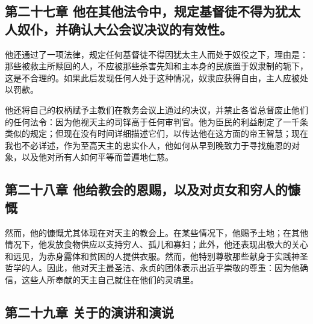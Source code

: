 
\subsection{第二十七章 他在其他法令中，规定基督徒不得为犹太人奴仆，并确认大公会议决议的有效性。}

他还通过了一项法律，规定任何基督徒不得因犹太主人而处于奴役之下，理由是：那些被救主所赎回的人，不应被那些杀害先知和主本身的民族置于奴隶制的轭下，这是不合理的。如果此后发现任何人处于这种情况，奴隶应获得自由，主人应被处以罚款。\par

他还将自己的权柄赋予主教们在教务会议上通过的决议，并禁止各省总督废止他们的任何法令：因为他视天主的司铎高于任何审判官。他为臣民的利益制定了一千条类似的规定；但现在没有时间详细描述它们，以传达他在这方面的帝王智慧；现在我也不必详述，作为至高天主的忠实仆人，他如何从早到晚致力于寻找施恩的对象，以及他对所有人如何平等而普遍地仁慈。\par


\subsection{第二十八章 他给教会的恩赐，以及对贞女和穷人的慷慨}

然而，他的慷慨尤其体现在对天主的教会上。在某些情况下，他赐予土地；在其他情况下，他发放食物供应以支持穷人、孤儿和寡妇；此外，他还表现出极大的关心和远见，为赤身露体和贫困的人提供衣服。然而，他特别尊敬那些献身于实践神圣哲学的人。因此，他对天主最圣洁、永贞的团体表示出近乎崇敬的尊重：因为他确信，这些人所奉献的天主自己就住在他们的灵魂里。\par


\subsection{第二十九章 关于的演讲和演说}

